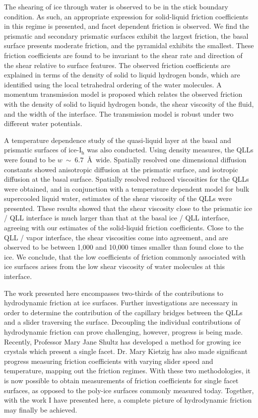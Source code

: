 The shearing of ice through water is observed to be in the stick
boundary condition. As such, an appropriate expression for
solid-liquid friction coefficients in this regime is presented, and
facet dependent friction is observed. We find the prismatic and
secondary prismatic surfaces exhibit the largest friction, the basal
surface presents moderate friction, and the pyramidal exhibits the
smallest. These friction coefficients are found to be invariant to the
shear rate and direction of the shear relative to surface
features. The observed friction coefficients are explained in terms of
the density of solid to liquid hydrogen bonds, which are identified
using the local tetrahedral ordering of the water molecules. A
momentum transmission model is proposed which relates the observed
friction with the density of solid to liquid hydrogen bonds, the shear
viscosity of the fluid, and the width of the interface. The
transmission model is robust under two different water potentials.

A temperature dependence study of the quasi-liquid layer at the basal
and prismatic surfaces of ice-I$_\mathrm{h}$ was also conducted. Using
density measures, the QLLs were found to be
$w~\sim~6.7$~\AA~wide. Spatially resolved one dimensional diffusion
constants showed anisotropic diffusion at the prismatic surface, and
isotropic diffusion at the basal surface. Spatially resolved reduced
viscosities for the QLLs were obtained, and in conjunction with a
temperature dependent model for bulk supercooled liquid water,
estimates of the shear viscosity of the QLLs were presented. These
results showed that the shear viscosity close to the prismatic ice /
QLL interface is much larger than that at the basal ice / QLL
interface, agreeing with our estimates of the solid-liquid friction
coefficients. Close to the QLL / vapor interface, the shear
viscosities come into agreement, and are observed to be between 1,000
and 10,000 times smaller than found close to the ice. We conclude,
that the low coefficients of friction commonly associated with ice
surfaces arises from the low shear viscosity of water molecules at
this interface. 

The work presented here encompasses two-thirds of the contributions to
hydrodynamic friction at ice surfaces. Further investigations are
necessary in order to determine the contribution of the capillary
bridges between the QLLs and a slider traversing the
surface. Decoupling the individual contributions of hydrodynamic
friction can prove challenging, however, progress is being
made. Recently, Professor Mary Jane Shultz has developed a method for
growing ice crystals which present a single facet. Dr. Mary Kietzig
has also made significant progress measuring friction coefficients
with varying slider speed and temperature, mapping out the friction
regimes. With these two methodologies, it is now possible to obtain
measurements of friction coefficients for single facet surfaces, as
opposed to the poly-ice surfaces commonly measured today. Together,
with the work I have presented here, a complete picture of
hydrodynamic friction may finally be achieved.

